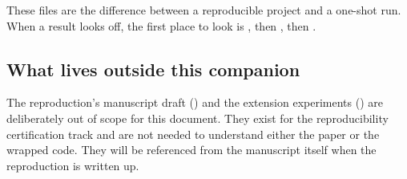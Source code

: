 These files are the difference between a reproducible project and a one-shot run. When a result looks off, the first place to look is , then , then .

\subsection{What lives outside this companion}
\label{sec:companion-scope}

The reproduction's manuscript draft () and the extension experiments () are deliberately out of scope for this document. They exist for the reproducibility certification track and are not needed to understand either the paper or the wrapped code. They will be referenced from the manuscript itself when the reproduction is written up.
